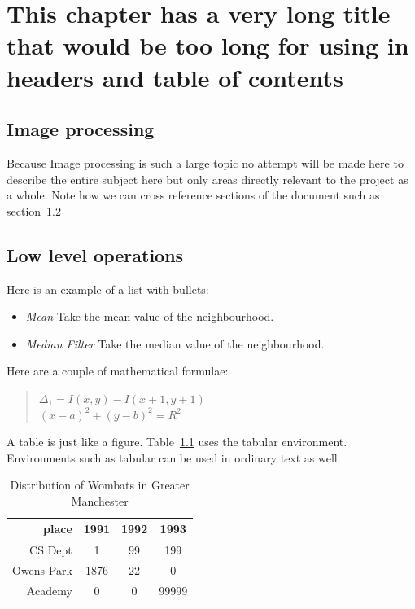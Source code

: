 \chapter[Short Chap title]{This chapter has a very long title that would be too long for using in headers and table of contents}
\section{Image processing}
Because Image processing is such a large topic no attempt will be made
here to describe the entire subject here but only areas directly
relevant to the project as a whole. Note how we can cross reference
sections of the document such as section~\ref{pg:filters}

\section{Low level operations}
\label{pg:filters}
Here is an example of a list with bullets:
\begin{itemize}
\item{\it Mean} Take the mean value of the neighbourhood.

\item{\it Median Filter} Take the median value of the neighbourhood.
\end{itemize}

Here are a couple of mathematical formulae:
\begin{quote}
\centering
$\Delta_1=I(x,y)-I(x+1,y+1)$ \\
$(x-a)^2+(y-b)^2=R^2$
\end{quote}

A table is just like a figure. Table~\ref{wombat} uses the tabular
environment.  Environments such as tabular can be used in ordinary
text as well.
\begin{table}
\begin{center}
\begin{tabular}{|r|c|c|c|}\hline\hline
place&1991&1992&1993\\\hline
CS Dept& 1&99&199\\
Owens Park& 1876& 22&0\\
Academy&0&0&99999\\\hline\hline
\end{tabular}
\end{center}
\caption{Distribution of Wombats in Greater Manchester}\label{wombat}
\end{table}


